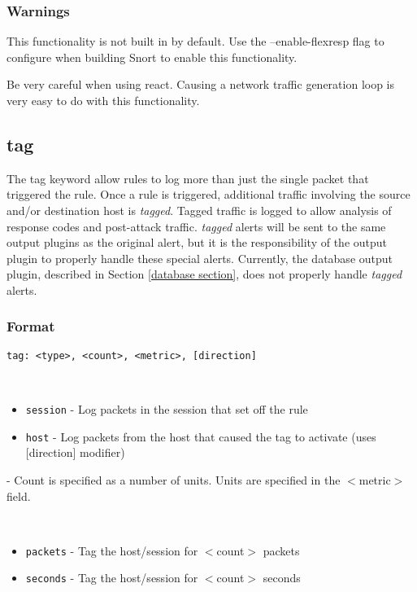 \documentclass[english]{report}
\begin{document}
\subsubsection{Warnings}

This functionality is not built in by default.  Use the --enable-flexresp flag to configure when building Snort to enable this functionality.

Be very careful when using react.  Causing a network traffic generation loop is very easy to do with this functionality.


\subsection{tag \label{tag section}}

The tag keyword allow rules to log more than just the single packet that
triggered the rule. Once a rule is triggered, additional traffic involving the
source and/or destination host is \emph{tagged}. Tagged traffic is logged to
allow analysis of response codes and post-attack traffic.  \emph{tagged} alerts
will be sent to the same output plugins as the original alert, but it is the
responsibility of the output plugin to properly handle these special alerts.
Currently, the database output plugin, described in Section \ref{database 
section}, does not properly handle \emph{tagged} alerts.


\subsubsection{Format}

\begin{verbatim}
tag: <type>, <count>, <metric>, [direction]
\end{verbatim}

\begin{description}{}
  \item [\texttt{type}]~
     \begin{itemize}{}
     \item \texttt{session} - Log packets in the session that set off the rule 
     \item \texttt{host} - Log packets from the host that caused the tag to activate (uses {[}direction{]} modifier)
     \end{itemize}
  \item [\texttt{count}] - Count is specified as a number of units. Units are specified in the $<$metric$>$ field.
  \item [\texttt{metric}]~
  \begin{itemize}{}
      \item \texttt{packets} - Tag the host/session for $<$count$>$ packets 
      \item \texttt{seconds} - Tag the host/session for $<$count$>$ seconds
   \end{itemize}
\end{description}
\end{document}
